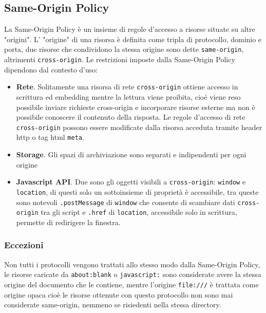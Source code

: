 \documentclass{sapthesis}
\newcommand{\code}[1]{\texttt{#1}}
\begin{document}
        \subsection{Same-Origin Policy}
        \label{sec:sicurezza-script-same-origin-policy}
            La Same-Origin Policy è un insieme di regole d'accesso a risorse situate su altre "origini".
            L' "origine" di una risorsa è definita come tripla di protocollo, dominio e porta, due risorse
            che condividono la stessa origine sono dette \code{same-origin}, altrimenti \code{cross-origin}.
            Le restrizioni imposte dalla Same-Origin Policy dipendono dal contesto d'uso:
            \begin{itemize}
                \item \textbf{Rete}. Solitamente una risorsa di rete \code{cross-origin} ottiene accesso in
                    scrittura ed embedding mentre la lettura viene proibita, cioé viene reso possibile
                    inviare richieste cross-origin e incorporare risorse esterne ma non è possibile
                    conoscere il contenuto della risposta.
                    Le regole d'accesso di rete \code{cross-origin} possono essere modificate dalla risorsa
                    acceduta tramite header http o tag html \code{meta}.

                \item \textbf{Storage}. Gli spazi di archiviazione sono separati e indipendenti per ogni origine

                \item \textbf{Javascript API}. Due sono gli oggetti visibili a \code{cross-origin}: \code{window}
                    e \code{location}, di questi solo un sottoinsieme di proprietà è accessibile, tra queste
                    sono notevoli \code{.postMessage} di \code{window} che consente di scambiare dati \code{cross-origin}
                    tra gli script e \code{.href} di \code{location}, accessibile solo in scrittura, permette di
                    redirigere la finestra.
            \end{itemize}

            \subsubsection{Eccezioni}
                Non tutti i protocolli vengono trattati allo stesso modo dalla Same-Origin Policy, le risorse
                caricate da \code{about:blank} o \code{javascript:} sono considerate avere la stessa origine del
                documento che le contiene, mentre l'origine \code{file:///} è trattata come origine opaca cioè
                le risorse ottenute con questo protocollo non sono mai considerate same-origin, nemmeno se
                risiedenti nella stessa directory.
\end{document}
